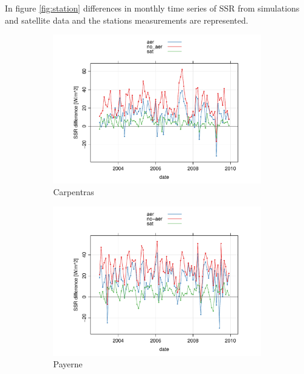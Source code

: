 In figure \ref{fig:station} differences in monthly time series of SSR from simulations and satellite data and the stations measurements are represented.

\begin{figure}[h!]
  \centering\begin{subfigure}{0.45\textwidth}
    \includegraphics[width=1.25\textwidth]{figs/capitulo6/CarpentrasMesesDif.pdf}
    \caption{Carpentras}
    \label{Carpentras}
  \end{subfigure}
  \centering\begin{subfigure}{0.45\textwidth}
    \includegraphics[width=1.25\textwidth]{figs/capitulo6/PayerneMesesDif.pdf}
    \caption{Payerne}
    \label{Payerne}
  \end{subfigure}
    \centering\begin{subfigure}{0.45\textwidth}

\end{subfigure}
\end{figure}
